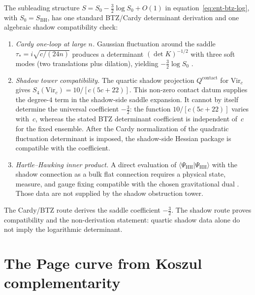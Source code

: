 \begin{computation}
\label{comp:bps-log-three-ways}
The subleading structure $S = S_0 - \tfrac{3}{2}\log S_0 + O(1)$
in equation~\eqref{eq:ent-btz-log}, with $S_0 = S_{\mathrm{BH}}$,
has one standard BTZ/Cardy determinant derivation and one algebraic
shadow compatibility check:
\begin{enumerate}[label=\textup{(\roman*)}]
\item \emph{Cardy one-loop at large $n$.}
 Gaussian fluctuation around the saddle $\tau_* = i\sqrt{c/(24n)}$
 produces a determinant $(\det K)^{-1/2}$ with three soft modes
 \textup{(}two translations plus dilation\textup{)}, yielding
 $-\tfrac{3}{2}\log S_0$ \cite{Carlip98,Cardy86}.
\item \emph{Shadow tower compatibility.}
 The quartic shadow projection $Q^{\mathrm{contact}}$ for
 $\mathrm{Vir}_c$ gives
 $S_4(\mathrm{Vir}_c) = 10/[c(5c+22)]$.  This non-zero
 contact datum supplies the degree-$4$ term in the shadow-side
 saddle expansion.  It cannot by itself determine the universal
 coefficient $-\tfrac32$: the function
 $10/[c(5c+22)]$ varies with~$c$, whereas the stated BTZ determinant
 coefficient is independent of~$c$ for the fixed ensemble.  After the
 Cardy normalization of the quadratic fluctuation determinant is
 imposed, the shadow-side Hessian package is compatible with the
 coefficient.
\item \emph{Hartle--Hawking inner product.}
 A direct evaluation of
$\langle\Psi_{\mathrm{HH}}|\Psi_{\mathrm{HH}}\rangle$ with the
shadow connection as a bulk flat connection requires a physical
 state, measure, and gauge fixing compatible with the chosen
 gravitational dual \cite{Hartle-Hawking83}.  Those data are not
 supplied by the shadow obstruction tower.
\end{enumerate}
The Cardy/BTZ route derives the saddle coefficient $-\tfrac32$.
The shadow route proves compatibility and the non-derivation statement:
quartic shadow data alone do not imply the logarithmic determinant.
\end{computation}

%
%

\section{The Page curve from Koszul complementarity}
\label{sec:ent-page-curve}

